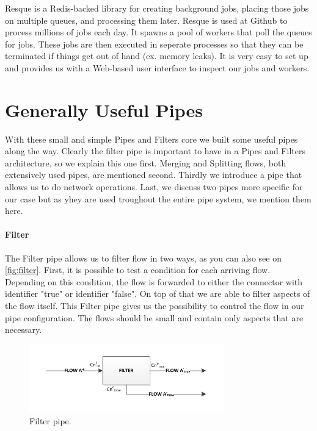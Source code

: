 Resque is a Redis-backed library for creating background jobs, placing those jobs on multiple queues, and processing them later. Resque is used at Github to process millions of jobs each day. It spawns a pool of workers that poll the queues for jobs. These jobs are then executed in seperate processes so that they can be terminated if things get out of hand (ex. memory leaks). It is very easy to set up and provides us with a Web-based user interface to inspect our jobs and workers.

\section{Generally Useful Pipes}

With these small and simple Pipes and Filters core we built some useful pipes along the way. Clearly the filter pipe is important to have in a Pipes and Filters architecture, so we explain this one first. Merging and Splitting flows, both extensively used pipes, are mentioned second. Thirdly we introduce a pipe that allows us to do network operations. Last, we discuss two pipes more specific for our case but as yhey are used troughout the entire pipe system, we mention them here.

\paragraph{Filter} \label{par:filterpipe} The Filter pipe allows us to filter flow in two ways, as you can also see on \autoref{fig:filter}. First, it is possible to test a condition for each arriving flow. Depending on this condition, the flow is forwarded to either the connector with identifier "true" or identifier "false". On top of that we are able to filter aspects of the flow itself. This Filter pipe gives us the possibility to control the flow in our pipe configuration. The flows should be small and contain only aspects that are necessary.

\begin{figure}[htp]
	\centering
		\includegraphics[width=0.75\textwidth]{fig/filter}
	\caption{Filter pipe.}
	\label{fig:filter}
\end{figure}

